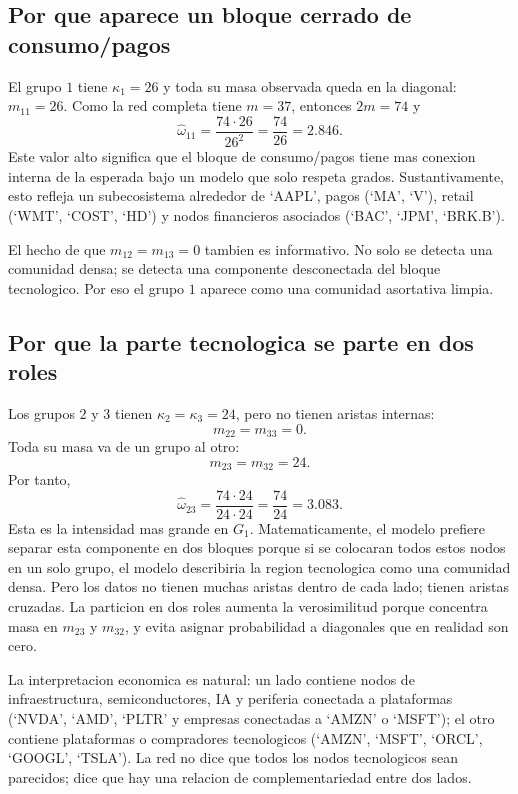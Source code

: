 \documentclass[11pt,letterpaper]{article}
\begin{document}
\subsection{Por que aparece un bloque cerrado de consumo/pagos}

El grupo $1$ tiene $\kappa_1=26$ y toda su masa observada queda en la diagonal: $m_{11}=26$. Como la red completa tiene $m=37$, entonces $2m=74$ y
\[
    \hat\omega_{11}
    =
    \frac{74\cdot 26}{26^2}
    =
    \frac{74}{26}
    =
    2.846.
\]
Este valor alto significa que el bloque de consumo/pagos tiene mas conexion interna de la esperada bajo un modelo que solo respeta grados. Sustantivamente, esto refleja un subecosistema alrededor de `AAPL', pagos (`MA', `V'), retail (`WMT', `COST', `HD') y nodos financieros asociados (`BAC', `JPM', `BRK.B').

El hecho de que $m_{12}=m_{13}=0$ tambien es informativo. No solo se detecta una comunidad densa; se detecta una componente desconectada del bloque tecnologico. Por eso el grupo $1$ aparece como una comunidad asortativa limpia.

\subsection{Por que la parte tecnologica se parte en dos roles}

Los grupos $2$ y $3$ tienen $\kappa_2=\kappa_3=24$, pero no tienen aristas internas:
\[
    m_{22}=m_{33}=0.
\]
Toda su masa va de un grupo al otro:
\[
    m_{23}=m_{32}=24.
\]
Por tanto,
\[
    \hat\omega_{23}
    =
    \frac{74\cdot 24}{24\cdot 24}
    =
    \frac{74}{24}
    =
    3.083.
\]
Esta es la intensidad mas grande en $G_1$. Matematicamente, el modelo prefiere separar esta componente en dos bloques porque si se colocaran todos estos nodos en un solo grupo, el modelo describiria la region tecnologica como una comunidad densa. Pero los datos no tienen muchas aristas dentro de cada lado; tienen aristas cruzadas. La particion en dos roles aumenta la verosimilitud porque concentra masa en $m_{23}$ y $m_{32}$, y evita asignar probabilidad a diagonales que en realidad son cero.

La interpretacion economica es natural: un lado contiene nodos de infraestructura, semiconductores, IA y periferia conectada a plataformas (`NVDA', `AMD', `PLTR' y empresas conectadas a `AMZN' o `MSFT'); el otro contiene plataformas o compradores tecnologicos (`AMZN', `MSFT', `ORCL', `GOOGL', `TSLA'). La red no dice que todos los nodos tecnologicos sean parecidos; dice que hay una relacion de complementariedad entre dos lados.
\end{document}

